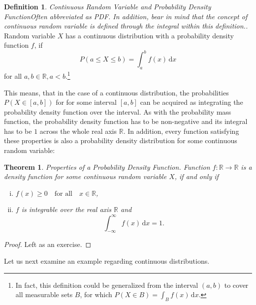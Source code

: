 \documentclass[12pt,a4paper,leqno]{report}
\newcommand{\R}{\mathbb{R}}
\newcommand{\dif}{\,\mathrm{d}}
\theoremstyle{plain}
\newtheorem{lause}[equation]{Theorem}
\theoremstyle{definition}
\newtheorem{maar}[equation]{Definition}
\begin{document}
\begin{maar}
\label{maar:cont_rv}
\emph{Continuous Random Variable and Probability Density Function\emph{Often abbreviated as PDF. In addition, bear in mind that the concept of continuous random variable is defined through the integral within this definition.}.}   Random variable $X$ has a continuous distribution with a probability density function $f$, if 
\[
P(a \leq X \leq b) = \int_a^b f(x)\dif{x}
\]
for all $a,b \in \R, a<b$.\footnote{In fact, this definition could be generalized from the interval $(a,b)$ to cover all measurable sets $B$, for which $P(X \in B) = \int_B f(x)\dif{x}$.}
\end{maar}

This means, that in the case of a continuous distribution, the probabilities $P(X \in [a,b])$ for for some interval $[a,b]$ can be acquired  as integrating the probability density function over the interval. As with the probability mass function, the probability density function has to be non-negative and its integral has to be $1$ across the whole real axis $\R$. In addition, every function satisfying these properties is also a probability density distribution for some continuous random variable:

\begin{lause}
Properties of a Probability Density Function. Function $f: \R \rightarrow \R$ is a density function for some continuous random variable $X$, if and only if
\begin{enumerate}[(i)]
\item $f(x) \geq 0 \quad \text{for all} \quad x \in \R$,
\item $f$ is integrable over the real axis $\R$ and  
\[
\int_{-\infty}^\infty f(x)\dif{x} = 1.
\]
\end{enumerate}
\end{lause}
\begin{proof}
Left as an exercise.
\end{proof}

Let us next examine an example regarding continuous distributions.
\end{document}
